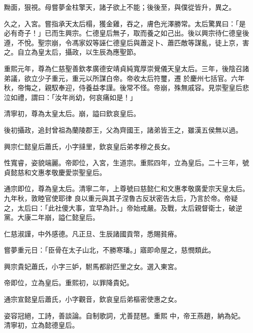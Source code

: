 \begin{pinyinscope}
 黝面，狠視。母嘗夢金柱擎天，諸子欲上不能；後後至，與僕從皆升，異之。



 久之，入宮。嘗指承天太后榻，獲金雞，吞之，膚色光澤勝常。太后驚異曰：「是必有奇子！」已而生興宗。仁德皇后無子，取而養之如己出。後以興宗待仁德皇後遵，不悅。聖宗崩，令馮家奴等誣仁德皇后與蕭浞卜、蕭匹敵等謀亂，徒上京，害之。自立為皇太后，攝政，以生辰為應聖節。



 重熙元年，尊為仁慈聖善欽孝廣德安靖貞純寬厚崇覺儀天皇太后。三年，後陰召諸弟議，欲立少子重元，重元以所謀白帝。帝收太后符璽，遷
 於慶州七括官。六年秋，帝悔之，親馭奉迎，侍養益孝謹。後常不怪。帝崩，殊無戚容。見崇聖皇后悲泣如禮，謂曰：「汝年尚幼，何哀痛如是！」



 清寧初，尊為太皇太后。崩，謚曰欽哀皇后。



 後初攝政，追封曾祖為蘭陵郡王，父為齊國王，諸弟皆王之，雖漢五侯無以過。



 興宗仁懿皇后蕭氏，小字撻里，欽哀皇后弟孝穆之長女。



 性寬睿，姿貌端麗。帝即位，入宮，生道宗。重熙四年，立為皇后。二十三年，號貞懿慈和文惠孝敬慶愛崇聖皇后。



 通宗即位，尊為皇太后。清寧二年，上尊號曰慈懿仁和文惠孝敬廣愛宗天皇太后。九年秋，敦睦官使耶律
 良以重元與其子涅魯古反狀密告太后，乃言於帝。帝疑之，太后曰：「此社傻大事，宜早為計。」帝始戒嚴。及戰，太后親督衛士，破逆黨。大康二年崩，謚仁懿皇后。



 仁慈淑謹，中外感德。凡正旦、生辰諸國貢幣，悉賜貧瘠。



 嘗夢重元日：「臣骨在太子山北，不勝寒璠。」寤即命屋之，慈憫類此。



 興宗貴妃蕭氏，小字三妒，駙馬都尉匹里之女。選入東宮。



 帝即位，立為皇后。重熙初，以罪降貴妃。



 通宗宣懿皇后蕭氏，小字觀音，欽哀皇后弟樞密使惠之女。



 姿容冠絕，工詩，善談論。自制歌詞，尤善琵琶。重熙
 中，帝王燕趙，納為妃。清寧初，立為懿德皇后。




\end{pinyinscope}
